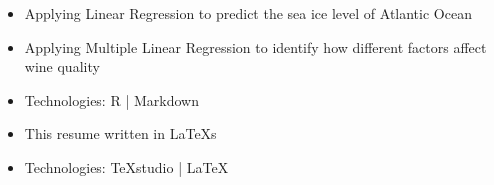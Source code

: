 \documentclass[10pt,a4paper,ragged2e]{altacv}
\begin{document}
\begin{paracol}{2}
\switchcolumn

\divider

\begin{itemize}
	\item Applying Linear Regression to predict the sea ice level of Atlantic Ocean
	\item Applying Multiple Linear Regression to identify how different factors affect wine quality
	\item Technologies: R | Markdown
\end{itemize}

\switchcolumn

\divider

\begin{itemize}
	\item This resume written in LaTeXs
	\item Technologies: TeXstudio | LaTeX
\end{itemize}

\end{paracol}

\newpage


\end{document}

